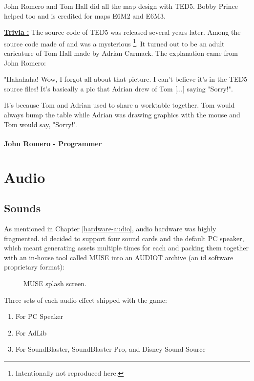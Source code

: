 \documentclass[book.tex]{subfiles}
\begin{document}
\par
John Romero and Tom Hall did all the map design with TED5. Bobby Prince helped too and is credited for maps E6M2 and E6M3.\\
\par
 \textbf{\underline{Trivia :}} The source code of TED5 was released several years later. Among the source code made of  and  was a mysterious \footnote{Intentionally not reproduced here.}. It turned out to be an adult caricature of Tom Hall made by Adrian Carmack. The explanation came from John Romero:\\%
\par
 \begin{fancyquotes}
   "Hahahaha! Wow, I forgot all about that picture. I can't believe it's 
in the TED5 source files! It's basically a pic that Adrian drew of Tom 
[...] saying "Sorry!".\\
\par 
It's because Tom and Adrian used to share a worktable together. Tom 
would always bump the table while Adrian was drawing graphics with the 
mouse and Tom would say, "Sorry!".\\
   \\
\textbf{John Romero - Programmer}
 \end{fancyquotes}











\section{Audio}

\subsection{Sounds}
As mentioned in Chapter \ref{hardware-audio}, audio hardware was highly fragmented. id decided to support four sound cards and the default PC speaker, which meant generating assets multiple times for each and packing them together with an in-house tool called MUSE into an AUDIOT archive (an id software proprietary format):\\
\begin{figure}[H]
\centering

  \caption{MUSE splash screen.}
 \end{figure}
 \par
 Three sets of each audio effect shipped with the game:
\begin{enumerate}
\item For PC Speaker
\item For AdLib
\item For SoundBlaster, SoundBlaster Pro, and Disney Sound Source
\end{enumerate}
\end{document}
